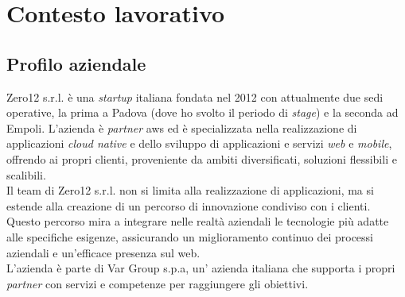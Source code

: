 

\chapter{Contesto lavorativo}
\label{cap:introduzione}
\section{Profilo aziendale}
Zero12 s.r.l. è una \textit{startup} italiana fondata nel 2012 con attualmente due sedi operative, la prima a Padova (dove ho svolto il periodo di \textit{stage}) e la seconda ad Empoli. 
L'azienda è \textit{partner} \gls{aws} ed è specializzata nella realizzazione di applicazioni \textit{cloud native} e dello sviluppo di applicazioni e servizi \textit{web} e \textit{mobile}, offrendo ai propri clienti, proveniente da ambiti diversificati, soluzioni flessibili e scalibili.\\
Il team di Zero12 s.r.l. non si limita alla realizzazione di applicazioni, ma si estende alla creazione di un percorso di innovazione condiviso con i clienti. Questo percorso mira a integrare nelle realtà aziendali le tecnologie più adatte alle specifiche esigenze, assicurando un miglioramento continuo dei processi aziendali e un’efficace presenza sul web.\\
L'azienda è parte di Var Group s.p.a, un' azienda italiana che supporta i propri \textit{partner} con servizi e competenze per raggiungere gli obiettivi.
